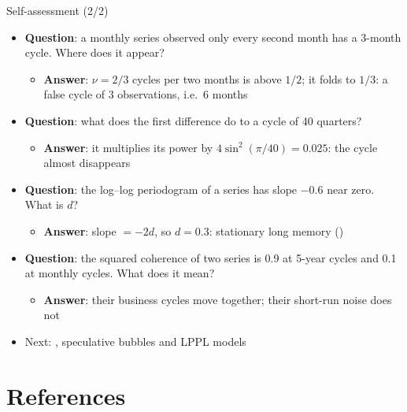\begin{frame}{Self-assessment (2/2)}
\itemsize{\footnotesize}
\begin{itemize}
    \item \textbf{Question}: a monthly series observed only every second month has a 3-month cycle. Where does it appear?
    \begin{itemize}
        \item \textbf{Answer}: $\nu = 2/3$ cycles per two months is above $1/2$; it folds to $1/3$: a false cycle of 3 observations, i.e.\ 6 months
    \end{itemize}
    \item \textbf{Question}: what does the first difference do to a cycle of 40 quarters?
    \begin{itemize}
        \item \textbf{Answer}: it multiplies its power by $4\sin^2(\pi/40) = 0.025$: the cycle almost disappears
    \end{itemize}
    \item \textbf{Question}: the log--log periodogram of a series has slope $-0.6$ near zero. What is $d$?
    \begin{itemize}
        \item \textbf{Answer}: slope $= -2d$, so $d = 0.3$: stationary long memory ()
    \end{itemize}
    \item \textbf{Question}: the squared coherence of two series is 0.9 at 5-year cycles and 0.1 at monthly cycles. What does it mean?
    \begin{itemize}
        \item \textbf{Answer}: their business cycles move together; their short-run noise does not
    \end{itemize}
    \item Next: , speculative bubbles and LPPL models
\end{itemize}
\end{frame}


\section{References}

